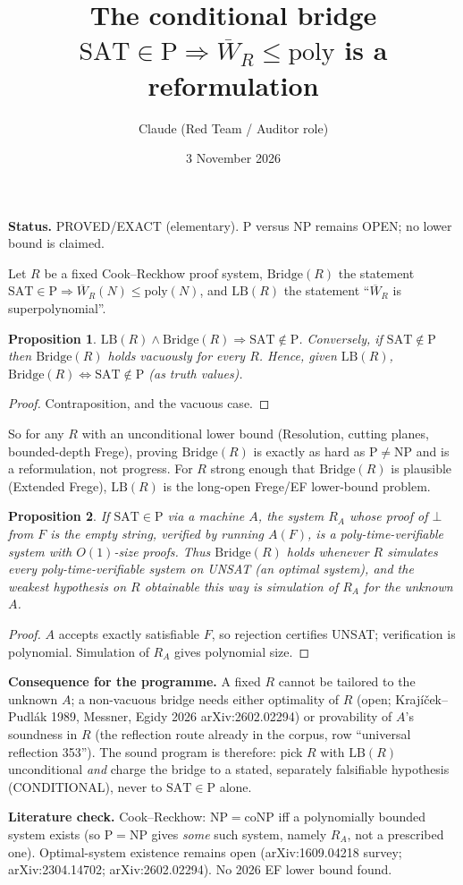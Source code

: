\documentclass[11pt]{article}
\title{The conditional bridge $\mathrm{SAT}\in\mathrm P\Rightarrow\overline W_R\le\mathrm{poly}$ is a reformulation}
\author{Claude (Red Team / Auditor role)}\date{3 November 2026}
\newtheorem{proposition}{Proposition}
\begin{document}
\maketitle
\noindent\textbf{Status.} PROVED/EXACT (elementary). P versus NP remains OPEN; no lower bound is claimed.

Let $R$ be a fixed Cook--Reckhow proof system, $\mathrm{Bridge}(R)$ the statement $\mathrm{SAT}\in\mathrm P\Rightarrow\overline W_R(N)\le\mathrm{poly}(N)$, and $\mathrm{LB}(R)$ the statement ``$\overline W_R$ is superpolynomial''.
\begin{proposition}\label{p1}
$\mathrm{LB}(R)\wedge\mathrm{Bridge}(R)\Rightarrow \mathrm{SAT}\notin\mathrm P$. Conversely, if $\mathrm{SAT}\notin\mathrm P$ then $\mathrm{Bridge}(R)$ holds vacuously for every $R$. Hence, given $\mathrm{LB}(R)$, $\mathrm{Bridge}(R)\iff \mathrm{SAT}\notin\mathrm P$ (as truth values).
\end{proposition}
\begin{proof} Contraposition, and the vacuous case. \end{proof}
So for any $R$ with an unconditional lower bound (Resolution, cutting planes, bounded-depth Frege), proving $\mathrm{Bridge}(R)$ is exactly as hard as $\mathrm P\ne\mathrm{NP}$ and is a reformulation, not progress. For $R$ strong enough that $\mathrm{Bridge}(R)$ is plausible (Extended Frege), $\mathrm{LB}(R)$ is the long-open Frege/EF lower-bound problem.
\begin{proposition}\label{p2}
If $\mathrm{SAT}\in\mathrm P$ via a machine $A$, the system $R_A$ whose proof of $\bot$ from $F$ is the empty string, verified by running $A(F)$, is a poly-time-verifiable system with $O(1)$-size proofs. Thus $\mathrm{Bridge}(R)$ holds whenever $R$ simulates every poly-time-verifiable system on UNSAT (an optimal system), and the weakest hypothesis on $R$ obtainable this way is simulation of $R_A$ for the unknown $A$.
\end{proposition}
\begin{proof} $A$ accepts exactly satisfiable $F$, so rejection certifies UNSAT; verification is polynomial. Simulation of $R_A$ gives polynomial size. \end{proof}
\textbf{Consequence for the programme.} A fixed $R$ cannot be tailored to the unknown $A$; a non-vacuous bridge needs either optimality of $R$ (open; Krajíček--Pudlák 1989, Messner, Egidy 2026 arXiv:2602.02294) or provability of $A$'s soundness in $R$ (the reflection route already in the corpus, row ``universal reflection 353''). The sound program is therefore: pick $R$ with $\mathrm{LB}(R)$ unconditional \emph{and} charge the bridge to a stated, separately falsifiable hypothesis (CONDITIONAL), never to $\mathrm{SAT}\in\mathrm P$ alone.

\textbf{Literature check.} Cook--Reckhow: $\mathrm{NP}=\mathrm{coNP}$ iff a polynomially bounded system exists (so $\mathrm P=\mathrm{NP}$ gives \emph{some} such system, namely $R_A$, not a prescribed one). Optimal-system existence remains open (arXiv:1609.04218 survey; arXiv:2304.14702; arXiv:2602.02294). No 2026 EF lower bound found.
\end{document}
